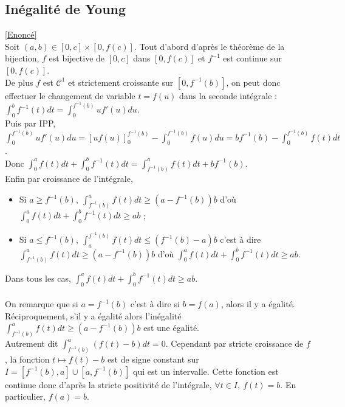 \documentclass{book}
\begin{document}
	\subsection{Inégalité de Young }\label{sec:inegalite-de-young-etoile2}
	\textcolor{blue}{\hyperref[young]{[Enoncé]}}\\
	Soit $(a,b)\in [0,c]\times[0,f(c)]$. Tout d'abord d'après le théorème de la bijection, $f$ est bijective de $[0,c]$ dans $[0,f(c)]$ et $f^{-1}$ est continue sur $[0,f(c)]$.\\
	De plus $f$ est $\mathcal C^1$ et strictement croissante sur $[0,f^{-1}(b)]$, on peut donc effectuer le changement de variable $t=f(u)$ dans la seconde intégrale : $\displaystyle\int_0^bf^{-1}(t)dt=\int_0^{f^{-1}(b)}uf'(u)du$.\\
	Puis par IPP, $\displaystyle\int_0^{f^{-1}(b)}uf'(u)du=\left[uf(u)\right]_0^{f^{-1}(b)}-\int_0^{f^{-1}(b)}f(u)du=bf^{-1}(b)-\int_0^{f^{-1}(b)}f(t)dt$.\\
	Donc $\displaystyle\int_0^a f(t)dt +\int_0^b f^{-1}(t)dt=\int_{f^{-1}(b)}^af(t)dt+bf^{-1}(b)$.\\
	Enfin par croissance de l'intégrale,
	\begin{itemize}
		\item Si $a\geq f^{-1}(b),\ \displaystyle\int_{f^{-1}(b)}^af(t)dt\geq (a-f^{-1}(b))b$ d'où $\displaystyle\int_0^a f(t)dt +\int_0^b f^{-1}(t)dt\geq ab$ ;
		\item Si $a\leq f^{-1}(b),\ \displaystyle\int_a^{f^{-1}(b)}f(t)dt\leq (f^{-1}(b)-a)b$ c'est à dire $\displaystyle\int_{f^{-1}(b)}^af(t)dt\geq (a-f^{-1}(b))b$ d'où $\displaystyle\int_0^a f(t)dt +\int_0^b f^{-1}(t)dt\geq ab$.
	\end{itemize}
	Dans tous les cas, $\displaystyle\int_0^a f(t)dt +\int_0^b f^{-1}(t)dt\geq ab$.\\\\
	On remarque que si $a=f^{-1}(b)$ c'est à dire si $b=f(a)$, alors il y a égalité.\\
	Réciproquement, s'il y a égalité alors l'inégalité $\displaystyle\int_{f^{-1}(b)}^af(t)dt\geq (a-f^{-1}(b))b$ est une égalité.\\
	Autrement dit $\displaystyle\int_{f^{-1}(b)}^a(f(t)-b)dt=0$. Cependant par stricte croissance de $f$, la fonction $t\mapsto f(t)-b$ est de signe constant sur $I=[f^{-1}(b),a]\cup[a,f^{-1}(b)]$ qui est un intervalle. Cette fonction est continue donc d'après la stricte positivité de l'intégrale, $\forall t\in I,\ f(t)=b$. En particulier, $f(a)=b$.
	
\end{document}
